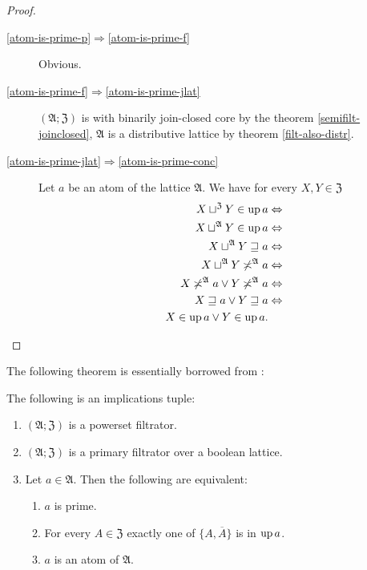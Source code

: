 \begin{proof}
~
\begin{description}
\item [{\ref{atom-is-prime-p}$\Rightarrow$\ref{atom-is-prime-f}}] Obvious.
\item [{\ref{atom-is-prime-f}$\Rightarrow$\ref{atom-is-prime-jlat}}] $(\mathfrak{A};\mathfrak{Z})$
is with binarily join-closed core by the theorem \ref{semifilt-joinclosed},
$\mathfrak{A}$ is a distributive lattice by theorem \ref{filt-also-distr}.
\item [{\ref{atom-is-prime-jlat}$\Rightarrow$\ref{atom-is-prime-conc}}] Let
$a$ be an atom of the lattice $\mathfrak{A}$. We have for every
$X,Y\in\mathfrak{Z}$
\begin{align*}
X\sqcup^{\mathfrak{Z}}Y\in\operatorname{up} a & \Leftrightarrow\\
X\sqcup^{\mathfrak{A}}Y\in\operatorname{up} a & \Leftrightarrow\\
X\sqcup^{\mathfrak{A}}Y\sqsupseteq a & \Leftrightarrow\\
X\sqcup^{\mathfrak{A}}Y\not\asymp^{\mathfrak{A}}a & \Leftrightarrow\\
X\not\asymp^{\mathfrak{A}}a\lor Y\not\asymp^{\mathfrak{A}}a & \Leftrightarrow\\
X\sqsupseteq a\lor Y\sqsupseteq a & \Leftrightarrow\\
X\in\operatorname{up} a\lor Y\in\operatorname{up} a.
\end{align*}

\end{description}
\end{proof}
The following theorem is essentially borrowed from \cite{stone-spaces}:
\begin{thm}
\label{f-prime-crit}The following is an implications tuple:
\begin{enumerate}
\item \label{prim-crit-p}$(\mathfrak{A};\mathfrak{Z})$ is a powerset filtrator.
\item \label{prim-crit-fltr}$(\mathfrak{A};\mathfrak{Z})$ is a primary
filtrator over a boolean lattice.
\item \label{prim-crit-conc}Let $a\in\mathfrak{A}$. Then the following
are equivalent:

\begin{enumerate}
\item \label{prim-prim}$a$ is prime.
\item \label{a-not-a}For every $A\in\mathfrak{Z}$ exactly one of $\{A,\overline{A}\}$
is in $\operatorname{up} a$.
\item \label{prim-atom}$a$ is an atom of $\mathfrak{A}$.
\end{enumerate}
\end{enumerate}
\end{thm}
